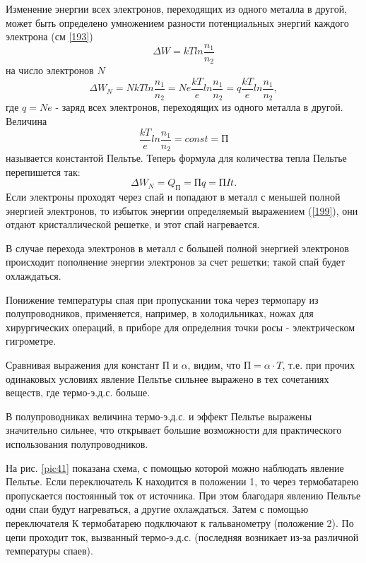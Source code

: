 \documentclass[a4paper,10pt]{book}
\begin{document}
Изменение энергии всех электронов, переходящих из одного металла в другой, может быть определено умножением разности потенциальных энергий каждого электрона (см \ref{193})
\begin{equation*}
 \Delta W = kTln\frac{n_1}{n_2}
\end{equation*}
на число электронов $N$
\begin{equation}\label{199}
 \Delta W_N = NkTln\frac{n_1}{n_2} = Ne\frac{kT}{e}ln\frac{n_1}{n_2} = q\frac{kT}{e}ln\frac{n_1}{n_2},
\end{equation}
где $q = Ne$ - заряд всех электронов, переходящих из одного металла в другой.
Величина
\begin{equation}\label{1910}
 \frac{kT}{e}ln\frac{n_1}{n_2} = const = \text{П}
\end{equation}
называется константой Пельтье. Теперь формула для количества тепла Пельтье перепишется так:
\begin{equation}\label{1911}
 \Delta W_N = Q_\text{П} = \text{П}q = \text{П}It.
\end{equation}
Если электроны проходят через спай и попадают в металл с меньшей полной энергией электронов, то избыток энергии определяемый выражением (\ref{199}), они отдают кристаллической решетке, и этот спай нагревается.

В случае перехода электронов в металл с большей полной энергией электронов происходит пополнение энергии электронов за счет решетки; такой спай будет охлаждаться.

Понижение температуры спая при пропускании тока через термопару из полупроводников, применяется, например, в холодильниках, ножах для хирургических операций, в приборе для определния точки росы - электрическом гигрометре.

Сравнивая выражения для констант П и $\alpha$, видим, что $\text{П}=\alpha\cdot T$, т.е. при прочих одинаковых условиях явление Пельтье сильнее выражено в тех сочетаниях веществ, где термо-э.д.с. больше.

В полупроводниках величина термо-э.д.с. и эффект Пельтье выражены значительно сильнее, что открывает большие возможности для практического использования полупроводников.

На рис. \ref{pic41} показана схема, с помощью которой можно наблюдать явление Пельтье. Если переключатель К находится в положении 1, то через термобатарею пропускается постоянный ток от источника. При этом благодаря явлению Пельтье одни спаи будут нагреваться, а другие охлаждаться. Затем с помощью переключателя К термобатарею подключают к гальванометру (положение 2). По цепи проходит ток, вызванный термо-э.д.с. (последняя возникает из-за различной температуры спаев).
\end{document}
